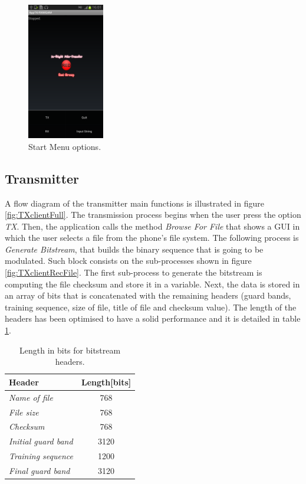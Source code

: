 \documentclass[12pt,a4paper,openright]{report}
\begin{document}
 \begin{figure}[H]
  \centering
    \includegraphics[width=0.3\textwidth]{menuoptions.png}
    \caption[Start Menu options]{Start Menu options.}
    \label{fig:menuoptions}
\end{figure}



\subsection{Transmitter}

A flow diagram of the transmitter main functions is illustrated in figure \ref{fig:TXclientFull}. The transmission process begins when the user press the option \emph{TX}. Then, the application calls the method \emph{Browse For File} that shows a GUI in which the user selects a file from the phone's file system. The following process is \emph{Generate Bitstream}, that builds the binary sequence that is going to be modulated. Such block consists on the sub-processes shown in figure \ref{fig:TXclientRecFile}. The first sub-process to generate the bitstream is computing the file checksum and store it in a variable. Next, the data is stored in an array of bits that is concatenated with the remaining headers (guard bands, training sequence, size of file, title of file and checksum value). The length of the headers has been optimised to have a solid performance and it is detailed in table \ref{table:headers}. 

\begin{table} [h]
\centering
\begin{tabular}{lc} 
\hline
\bf{Header}	& \bf{Length}\textnormal{[bits]}    \\
\hline
\emph{Name of file}       & 768              \\  
\emph{File size}        & 768              \\   
\emph{Checksum}        & 768              \\   
\hline
\emph{Initial guard band}      & 3120           \\   
\emph{Training sequence}    & 1200              \\
\emph{Final guard band}     & 3120              \\
   
  
\hline
\end{tabular}
\caption[Length in bits for bitstream headers]{Length in bits for bitstream headers.}
\label{table:headers}
\end{table}
\end{document}
